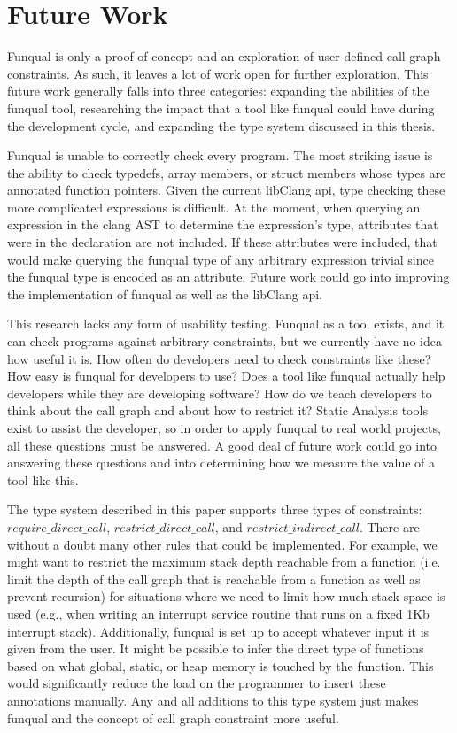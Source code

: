 \chapter{Future Work}\label{sec:future}

Funqual is only a proof-of-concept and an exploration of user-defined call graph constraints.  As such, it leaves a lot of work open for further exploration.  This future work generally falls into three categories: expanding the abilities of the funqual tool, researching the impact that a tool like funqual could have during the development cycle, and expanding the type system discussed in this thesis.  

Funqual is unable to correctly check every program.  The most striking issue is the ability to check typedefs, array members, or struct members whose types are annotated function pointers.  Given the current libClang api, type checking these more complicated expressions is difficult.  At the moment, when querying an expression in the clang AST to determine the expression's type, attributes that were in the declaration are not included.  If these attributes were included, that would make querying the funqual type of any arbitrary expression trivial since the funqual type is encoded as an attribute.  Future work could go into improving the implementation of funqual as well as the libClang api.  

This research lacks any form of usability testing.  Funqual as a tool exists, and it can check programs against arbitrary constraints, but we currently have no idea how useful it is.  How often do developers need to check constraints like these?  How easy is funqual for developers to use?  Does a tool like funqual actually help developers while they are developing software?  How do we teach developers to think about the call graph and about how to restrict it?  Static Analysis tools exist to assist the developer, so in order to apply funqual to real world projects, all these questions must be answered.  A good deal of future work could go into answering these questions and into determining how we measure the value of a tool like this.  

The type system described in this paper supports three types of constraints: $require\_direct\_call$, $restrict\_direct\_call$, and $restrict\_indirect\_call$.  There are without a doubt many other rules that could be implemented.  For example, we might want to restrict the maximum stack depth reachable from a function (i.e. limit the depth of the call graph that is reachable from a function as well as prevent recursion) for situations where we need to limit how much stack space is used (e.g., when writing an interrupt service routine that runs on a fixed 1Kb interrupt stack).  Additionally, funqual is set up to accept whatever input it is given from the user.  It might be possible to infer the direct type of functions based on what global, static, or heap memory is touched by the function.  This would significantly reduce the load on the programmer to insert these annotations manually.  Any and all additions to this type system just makes funqual and the concept of call graph constraint more useful.

